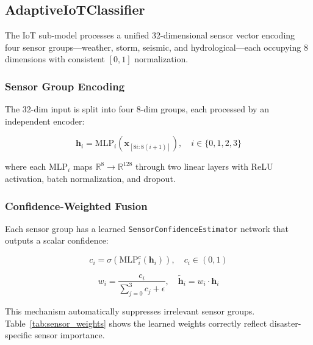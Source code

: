 \documentclass[journal]{IEEEtran}
\begin{document}
\subsection{AdaptiveIoTClassifier}

The IoT sub-model processes a unified 32-dimensional sensor vector encoding four sensor groups---weather, storm, seismic, and hydrological---each occupying 8 dimensions with consistent $[0, 1]$ normalization.

\subsubsection{Sensor Group Encoding}

The 32-dim input is split into four 8-dim groups, each processed by an independent encoder:

\begin{equation}
\mathbf{h}_i = \text{MLP}_i(\mathbf{x}_{[8i:8(i+1)]}), \quad i \in \{0,1,2,3\}
\end{equation}

where each $\text{MLP}_i$ maps $\mathbb{R}^8 \to \mathbb{R}^{128}$ through two linear layers with ReLU activation, batch normalization, and dropout.

\subsubsection{Confidence-Weighted Fusion}

Each sensor group has a learned \texttt{SensorConfidenceEstimator} network that outputs a scalar confidence:

\begin{equation}
c_i = \sigma(\text{MLP}^c_i(\mathbf{h}_i)), \quad c_i \in (0, 1)
\end{equation}

\begin{equation}
w_i = \frac{c_i}{\sum_{j=0}^{3} c_j + \epsilon}, \quad \tilde{\mathbf{h}}_i = w_i \cdot \mathbf{h}_i
\end{equation}

This mechanism automatically suppresses irrelevant sensor groups. Table~\ref{tab:sensor_weights} shows the learned weights correctly reflect disaster-specific sensor importance.
\end{document}
